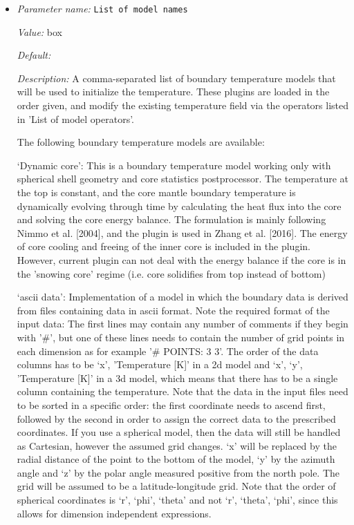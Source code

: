 \begin{itemize}
\item {\it Parameter name:} {\tt List of model names}
\label{parameters:Boundary temperature model/List of model names}


{\it Value:} box


{\it Default:} 


{\it Description:} A comma-separated list of boundary temperature models that will be used to initialize the temperature. These plugins are loaded in the order given, and modify the existing temperature field via the operators listed in 'List of model operators'.

The following boundary temperature models are available:

`Dynamic core': This is a boundary temperature model working only with spherical shell geometry and core statistics postprocessor. The temperature at the top is constant, and the core mantle boundary temperature is dynamically evolving through time by calculating the heat flux into the core and solving the core energy balance. The formulation is mainly following Nimmo et al. [2004], and the plugin is used in Zhang et al. [2016]. The energy of core cooling and freeing of the inner core is included in the plugin. However, current plugin can not deal with the energy balance if the core is in the 'snowing core' regime (i.e. core solidifies from top instead of bottom)

`ascii data': Implementation of a model in which the boundary data is derived from files containing data in ascii format. Note the required format of the input data: The first lines may contain any number of comments if they begin with '\#', but one of these lines needs to contain the number of grid points in each dimension as for example '\# POINTS: 3 3'. The order of the data columns has to be `x', 'Temperature [K]' in a 2d model and  `x', `y', 'Temperature [K]' in a 3d model, which means that there has to be a single column containing the temperature. Note that the data in the input files need to be sorted in a specific order: the first coordinate needs to ascend first, followed by the second in order to assign the correct data to the prescribed coordinates. If you use a spherical model, then the data will still be handled as Cartesian, however the assumed grid changes. `x' will be replaced by the radial distance of the point to the bottom of the model, `y' by the azimuth angle and `z' by the polar angle measured positive from the north pole. The grid will be assumed to be a latitude-longitude grid. Note that the order of spherical coordinates is `r', `phi', `theta' and not `r', `theta', `phi', since this allows for dimension independent expressions.


\end{itemize}
